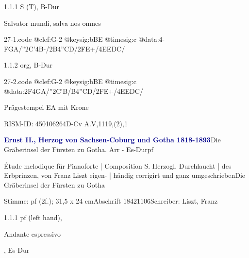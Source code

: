 \documentclass[a4paper, twocolumn, 11pt]{book}
\begin{document}
\par 1.1.1  S (T), B-Dur\newline \begin{footnotesize} Salvator mundi, salva nos omnes \end{footnotesize}  
\begin{filecontents*}{27-1.code}
@clef:G-2
@keysig:bBE
@timesig:c
@data:4-FGA/''2C'4B-/2B4''CD/2FE+/4EEDC/
\end{filecontents*}
\newline %
\par 1.1.2  org, B-Dur  
\begin{filecontents*}{27-2.code}
@clef:G-2
@keysig:bBE
@timesig:c
@data:2F4GA/''2C'B/B4''CD/2FE+/4EEDC/
\end{filecontents*}
\newline %
\par Prägestempel {\textquotedbl}EA{\textquotedbl} mit Krone
\par RISM-ID: 450106264\newline D-Cv  A.V,1119,(2),1
\par \vspace{16pt} \textcolor{darkblue}{\textbf{Ernst II., Herzog von Sachsen-Coburg und Gotha  1818-1893}}\hfillplus{[28]}\newline Die Gräberinsel der Fürsten zu Gotha. Arr - Es-Dur\newline pf
\par \begin{itshape} Étude melodique für Pianoforte | Composition S. Herzogl. Durchlaucht | des Erbprinzen, von Franz Liszt eigen- | händig corrigirt und ganz umgeschrieben Die Gräberinsel der Fürsten zu Gotha\end{itshape} 
\par \textcolor{darkblue}{}  Stimme: pf  (2f.); 31,5 x 24 cm\newline Abschrift  18421106\newline Schreiber: Liszt, Franz
\par 1.1.1  pf (left hand), \begin{itshape}Andante espressivo\end{itshape}, Es-Dur  
\end{document}
